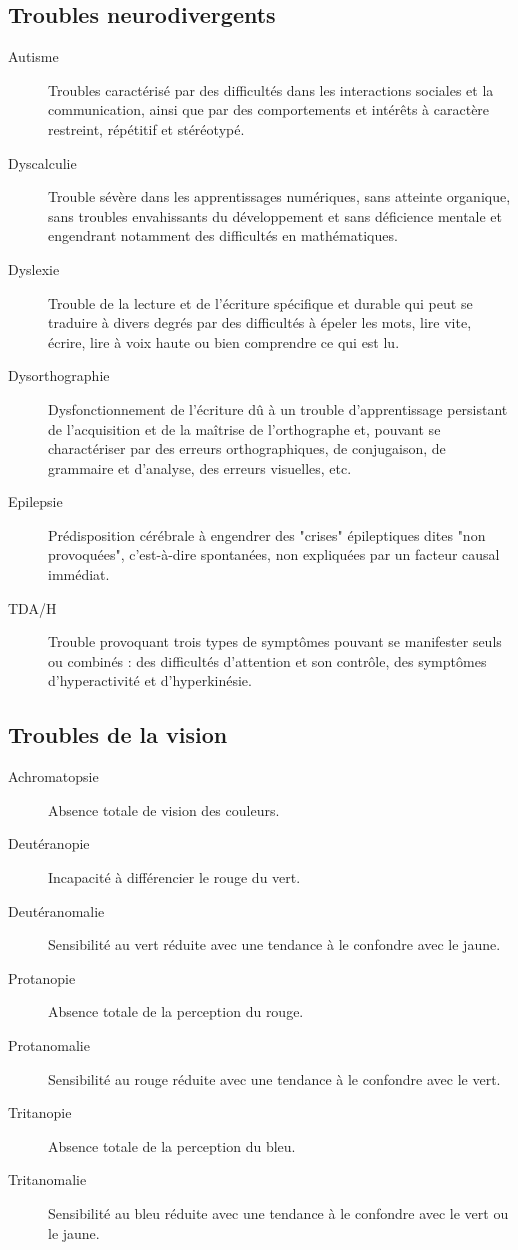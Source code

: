 \documentclass[a4paper,12pt]{article}
\begin{document}
\begin{multicols}{2}
\subsection*{Troubles neurodivergents}
\label{sec:org992d32e}
\begin{description}
\item[{Autisme}] Troubles caractérisé par des difficultés dans les interactions sociales et la communication, ainsi que par des comportements et intérêts à caractère restreint, répétitif et stéréotypé.
\item[{Dyscalculie}] Trouble sévère dans les apprentissages numériques, sans atteinte organique, sans troubles envahissants du développement et sans déficience mentale et engendrant notamment des difficultés en mathématiques.
\item[{Dyslexie}] Trouble de la lecture et de l'écriture spécifique et durable qui peut se traduire à divers degrés par des difficultés à épeler les mots, lire vite, écrire, lire à voix haute ou bien comprendre ce qui est lu.
\item[{Dysorthographie}] Dysfonctionnement de l’écriture dû à un trouble d'apprentissage persistant de l’acquisition et de la maîtrise de l’orthographe et, pouvant se charactériser par des erreurs orthographiques, de conjugaison, de grammaire et d’analyse, des erreurs visuelles, etc.
\item[{Epilepsie}] Prédisposition cérébrale à engendrer des "crises" épileptiques dites "non provoquées", c'est-à-dire spontanées, non expliquées par un facteur causal immédiat.
\item[{TDA/H}] Trouble provoquant trois types de symptômes pouvant se manifester seuls ou combinés : des difficultés d'attention et son contrôle, des symptômes d'hyperactivité et d'hyperkinésie.
\end{description}
\subsection*{Troubles de la vision}
\label{sec:org0ffdd6f}
\begin{description}
\item[{Achromatopsie}] Absence totale de vision des couleurs.
\item[{Deutéranopie}] Incapacité à différencier le rouge du vert.
\item[{Deutéranomalie}] Sensibilité au vert réduite avec une tendance à le confondre avec le jaune.
\item[{Protanopie}] Absence totale de la perception du rouge.
\item[{Protanomalie}] Sensibilité au rouge réduite avec une tendance à le confondre avec le vert.
\item[{Tritanopie}] Absence totale de la perception du bleu.
\item[{Tritanomalie}] Sensibilité au bleu réduite avec une tendance à le confondre avec le vert ou le jaune.
\end{description}

\end{multicols}
\end{document}
